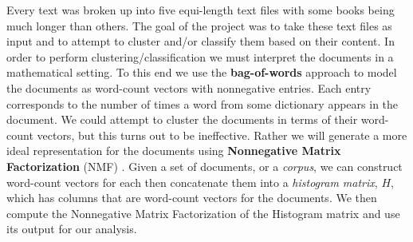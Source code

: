 \documentclass[fleqn,10pt]{../SelfArx} %
\begin{document}
Every text was broken up into five equi-length text files with some books being much longer than others. The goal of the project was to take these text files as input and to attempt to cluster and/or classify them based on their content. In order to perform clustering/classification we must interpret the documents in a mathematical setting. To this end we use the \textbf{bag-of-words} approach to model the documents as word-count vectors with nonnegative entries. Each entry corresponds to the number of times a word from some dictionary appears in the document. We could attempt to cluster the documents in terms of their word-count vectors, but this turns out to be ineffective. Rather we will generate a more ideal representation for the documents using \textbf{Nonnegative Matrix Factorization} (NMF) \cite{shahnaz2006document}. Given a set of documents, or a \textit{corpus}, we can construct word-count vectors for each then concatenate them into a \textit{histogram matrix}, $H$, which has columns that are word-count vectors for the documents. We then compute the Nonnegative Matrix Factorization of the Histogram matrix and use its output for our analysis.
\end{document}
